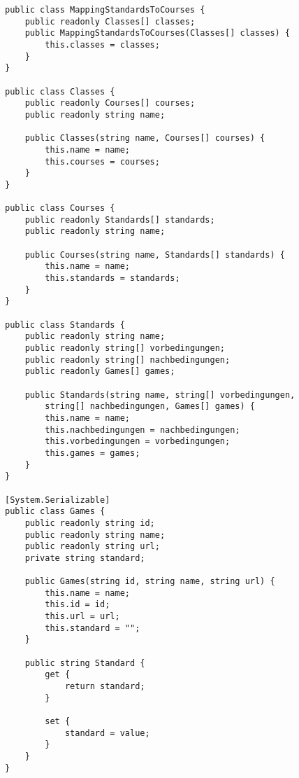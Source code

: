\begin{scriptsize}
				\lstset{
					float,
					caption=MappingStandardsToCourses.cs, 
					language=[Sharp]C, 
					frame=single,  
					showstringspaces=false, 
					showspaces=false, 
					numbers=left, 
					captionpos=b, 
					belowcaptionskip=4pt,
					basicstyle=\ttfamily
				} 
				\begin{lstlisting}[label=lst:methode3]
public class MappingStandardsToCourses {
    public readonly Classes[] classes;
    public MappingStandardsToCourses(Classes[] classes) {
        this.classes = classes;
    }
}

public class Classes {
    public readonly Courses[] courses;
    public readonly string name; 

    public Classes(string name, Courses[] courses) {
        this.name = name; 
        this.courses = courses; 
    }
}

public class Courses {
    public readonly Standards[] standards;
    public readonly string name; 

    public Courses(string name, Standards[] standards) {
        this.name = name;
        this.standards = standards;
    }
}
    
public class Standards {
    public readonly string name;
    public readonly string[] vorbedingungen;
    public readonly string[] nachbedingungen;
    public readonly Games[] games;

    public Standards(string name, string[] vorbedingungen, 
    	string[] nachbedingungen, Games[] games) {
        this.name = name; 
        this.nachbedingungen = nachbedingungen;
        this.vorbedingungen = vorbedingungen; 
        this.games = games;
    }
}

[System.Serializable]
public class Games {
    public readonly string id;
    public readonly string name;
    public readonly string url;
    private string standard;

    public Games(string id, string name, string url) {
        this.name = name;
        this.id = id;
        this.url = url;
        this.standard = "";
    }

    public string Standard {
        get {
            return standard;
        }

        set {
            standard = value;
        }
    }
}
				\end{lstlisting}
			\end{scriptsize}